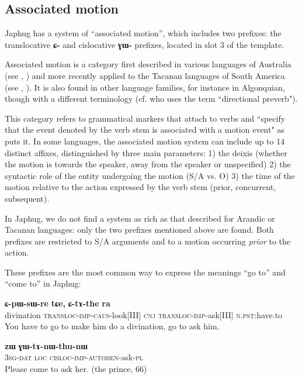 \documentclass[oldfontcommands,twoside,a4paper,12pt]{article}
\newcommand{\ipa}[1]{{\phon\textbf{#1}}}
\begin{document}
\subsection{Associated motion} \label{subsec:associated}
Japhug has a system of ``associated motion'', which includes two prefixes: the translocative \ipa{ɕ-} and cislocative \ipa{ɣɯ-} prefixes, located in slot 3 of the template.

Associated motion is a category first described in various languages of Australia (see \citealt{koch84associated.motion}, \citealt{wilkins91associated.motion}) and more recently applied to the Tacanan languages of South America (see \citealt{guillaume08cavinena}, \citealt{guillaume.associated.motion}). It is also found in other language families, for instance in Algonquian, though with a different terminology (cf. \citealt[729-733]{valentine01grammar} who uses the term ``directional preverb").

This   category refers to grammatical markers that attach to verbs and ``specify that the event denoted by the verb stem is associated with a motion event" as \citet[207]{wilkins91associated.motion} puts it. In some languages, the associated motion system can include up to 14 distinct affixes, distinguished by three main parameters: 1) the deixis (whether the motion is towards the speaker, away from the speaker or unspecified) 2) the syntactic role of the entity undergoing the motion (S/A vs. O) 3) the time of the motion relative to the action expressed by the verb stem (prior, concurrent, subsequent). 

In Japhug, we do not find a system as rich as that described for Arandic or Tacanan languages: only the two prefixes mentioned above are found. Both prefixes are restricted to S/A arguments and to a motion occurring \textit{prior} to the action.


These prefixes are the most common way to express the meanings ``go to'' and ``come to'' in Japhug:
\begin{exe}
\ex 
\gll \ipa{mphrɯmɯ}  	\ipa{ɕ-pɯ-sɯ-re}   	\ipa{tɕe,}   	\ipa{ɕ-tɤ-the}   	\ipa{ra}    \\
 divination \textsc{transloc}-\textsc{imp}-\textsc{caus}-look[III] \textsc{cnj} \textsc{transloc}-\textsc{imp}-ask[III] \textsc{n.pst}:have.to \\
 \glt You have to go to make him do a divination, go to ask him.
 
 \ex
\gll 	\ipa{ɯ-ɕki}   	\ipa{zɯ}   	\ipa{ɣɯ-tɤ-nɯ-thu-nɯ}   	\\
3\textsc{sg}-\textsc{dat}  \textsc{loc}  \textsc{cisloc}-\textsc{imp}-\textsc{autoben}-ask-\textsc{pl} \\
\glt 	Please come  to ask her. (the prince, 66)
\end{exe}
\end{document}
